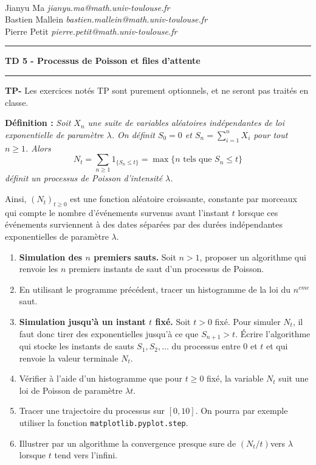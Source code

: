 \documentclass[solutions]{exercices}
\begin{document}
{
\\
Jianyu Ma \hfill \textit{jianyu.ma@math.univ-toulouse.fr}\\
Bastien Mallein \hfill \textit{bastien.mallein@math.univ-toulouse.fr}\\
Pierre Petit \hfill \textit{pierre.petit@math.univ-toulouse.fr}}


\vspace{2ex}

 \hrule
\begin{center}
\textbf{\large TD 5 - Processus de Poisson et files d'attente}
\vspace{2ex}
\end{center}
\hrule

\bigskip
\textbf{TP-} Les exercices notés TP sont purement optionnels, et ne seront pas traités en classe.


\textbf{Définition :} \textit{Soit $X_n$ une suite de variables aléatoires indépendantes de loi exponentielle de paramètre $\lambda$. On définit  $S_0=0$ et $S_n=\sum_{i=1}^n X_i$ pour tout $n\ge1$.
Alors
$$N_t=\sum_{n\geq 1}1_{\{S_n\leq t\}}=\max \{n\text{ tels que } S_{n}\leq t\}$$
définit un processus de Poisson d'intensité $\lambda$.}

Ainsi, $(N_t)_{t\ge0}$ est une fonction aléatoire croissante, constante par morceaux qui compte le nombre d'événements survenus avant l'instant $t$ lorsque ces événements surviennent à des dates séparées par des durées indépendantes exponentielles de paramètre $\lambda$.

\begin{exercice}
\begin{enumerate}
\item \textbf{Simulation des $n$ premiers sauts.} Soit $n>1$, proposer un algorithme qui renvoie les $n$ premiers instants de saut d'un processus de Poisson.
\item En utilisant le programme précédent, tracer un histogramme de la loi du $n^{eme}$ saut.
\item \textbf{Simulation jusqu'à un instant $t$ fixé.}
Soit $t>0$ fixé. Pour simuler $N_t$, il faut donc tirer des exponentielles jusqu'à ce que $S_{n+1}> t$. \'Ecrire l'algorithme qui stocke les instants de sauts $S_1,S_2,\ldots$ du processus entre $0$ et $t$ et qui renvoie la valeur terminale $N_t$.
\item Vérifier à l'aide d'un histogramme que pour $t\ge0$ fixé, la variable $N_t$ suit une loi de Poisson de paramètre $\lambda t$.
\item Tracer une trajectoire du processus sur $[0,10]$. On pourra par exemple utiliser la fonction \texttt{matplotlib.pyplot.step}.
\item Illustrer par un algorithme la convergence presque sure de $(N_t/t)$vers $\lambda$ lorsque $t$ tend vers l'infini.
\end{enumerate}
\end{exercice}
\end{document}
